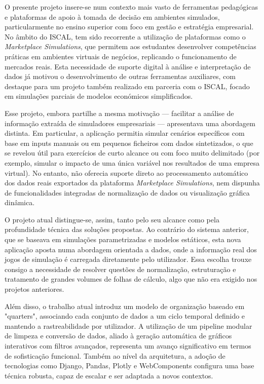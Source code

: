 O presente projeto insere-se num contexto mais vasto de ferramentas pedagógicas e plataformas de apoio à tomada de decisão em ambientes simulados, particularmente no ensino superior com foco em gestão e estratégia empresarial. No âmbito do ISCAL, tem sido recorrente a utilização de plataformas como o \textit{Marketplace Simulations}, que permitem aos estudantes desenvolver competências práticas em ambientes virtuais de negócios, replicando o funcionamento de mercados reais. Esta necessidade de suporte digital à análise e interpretação de dados já motivou o desenvolvimento de outras ferramentas auxiliares, com destaque para um projeto também realizado em parceria com o ISCAL, focado em simulações parciais de modelos económicos simplificados.

Esse projeto, embora partilhe a mesma motivação — facilitar a análise de informação extraída de simuladores empresariais — apresentava uma abordagem distinta. Em particular, a aplicação permitia simular cenários específicos com base em inputs manuais ou em pequenos ficheiros com dados sintetizados, o que se revelou útil para exercícios de curto alcance ou com foco muito delimitado (por exemplo, simular o impacto de uma única variável nos resultados de uma empresa virtual). No entanto, não oferecia suporte direto ao processamento automático dos dados reais exportados da plataforma \textit{Marketplace Simulations}, nem dispunha de funcionalidades integradas de normalização de dados ou visualização gráfica dinâmica.

O projeto atual distingue-se, assim, tanto pelo seu alcance como pela profundidade técnica das soluções propostas. Ao contrário do sistema anterior, que se baseava em simulações parametrizadas e modelos estáticos, esta nova aplicação aposta numa abordagem orientada a dados, onde a informação real dos jogos de simulação é carregada diretamente pelo utilizador. Essa escolha trouxe consigo a necessidade de resolver questões de normalização, estruturação e tratamento de grandes volumes de folhas de cálculo, algo que não era exigido nos projetos anteriores.

Além disso, o trabalho atual introduz um modelo de organização baseado em "quarters", associando cada conjunto de dados a um ciclo temporal definido e mantendo a rastreabilidade por utilizador. A utilização de um pipeline modular de limpeza e conversão de dados, aliado à geração automática de gráficos interativos com filtros avançados, representa um avanço significativo em termos de sofisticação funcional. Também ao nível da arquitetura, a adoção de tecnologias como Django, Pandas, Plotly e WebComponents configura uma base técnica robusta, capaz de escalar e ser adaptada a novos contextos.

